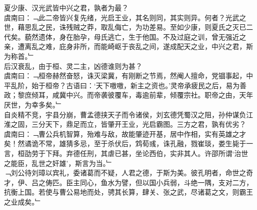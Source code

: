 夏少康、汉光武皆中兴之君，孰者为最？\\
虞南曰：﹁此二帝皆兴复先绪，光启王业，其名则同，其实则异。何者？光武之世，藉思乱之民，诛残贼之莽，取乱侮亡，为功差易。至如少康，则夏氏之灭已二代矣。藐然遗体，身在胎孕，母氏逃亡，生于他国。不及过庭之训，曾无强近之亲，遭离乱之难，庇身非所，而能崎岖于丧乱之间，遂成配天之业，中兴之君，斯为称首。﹂
\\
后汉衰乱，由于桓、灵二主，凶德谁则为甚？\\
虞南曰：﹁桓帝赫然奋怒，诛灭梁冀，有刚断之节焉，然阉人擅命，党锢事起，中平乱阶，始于桓帝？古语曰：‘天下嗷嗷，新主之资也。’灵帝承疲民之后，易为善政；黎庶倾耳，咸冀中兴。而帝袭彼覆车，毒逾前辈，倾覆宗社。职帝之由，天年厌世，为幸多矣。﹂
\\
自炎精不竞，宇县分崩，曹孟德挟天子而令诸侯，刘玄德凭蜀汉之阻，孙仲谋负江淮之固，三分天下，鼎足而立，皆肇开王业，光启霸图。三方之君，孰有优劣？\\
虞南曰：﹁曹公兵机智算，殆难与敌，故能肇迹开基，居中作相，实有英雄之才矣！然谲诡不常，雄猜多忌，至于杀伏后，鸩荀彧，诛孔融，戮崔琰，娄生毙于一言，桓劭劳于下拜。弃德任刑，其虐已甚，坐论西伯，实非其人。许邵所谓‘治世之能臣，乱世之奸雄’，斯言为当。﹂\\
﹁刘公待刘璋以宾礼，委诸葛而不疑，人君之德，于斯为美。彼孔明者，命世之奇才，伊、吕之俦匹。臣主同心，鱼水为譬，但以国小兵弱，斗绝一隅，支对二方，抗衡上国。若使与曹公易地而处，骋其长算，肆关、张之武，尽诸葛之文，则霸王之业成矣。﹂\\
